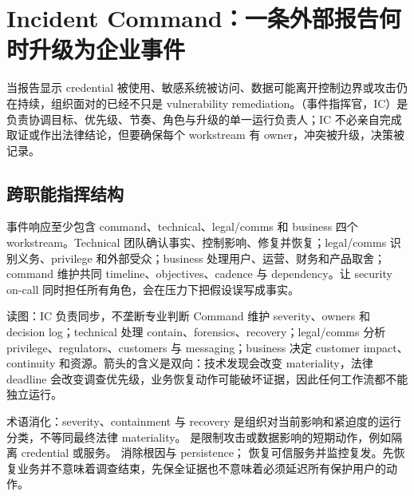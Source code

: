\section{Incident Command：一条外部报告何时升级为企业事件}

当报告显示 credential 被使用、敏感系统被访问、数据可能离开控制边界或攻击仍在持续，组织面对的已经不只是 vulnerability remediation。（事件指挥官，IC）是负责协调目标、优先级、节奏、角色与升级的单一运行负责人；IC 不必亲自完成取证或作出法律结论，但要确保每个 workstream 有 owner，冲突被升级，决策被记录。

\subsection{跨职能指挥结构}

事件响应至少包含 command、technical、legal/comms 和 business 四个 workstream。Technical 团队确认事实、控制影响、修复并恢复；legal/comms 识别义务、privilege 和外部受众；business 处理用户、运营、财务和产品取舍；command 维护共同 timeline、objectives、cadence 与 dependency。让 security on-call 同时担任所有角色，会在压力下把假设误写成事实。


\begin{knowledgebox}{读图：IC 负责同步，不垄断专业判断}
Command 维护 severity、owners 和 decision log；technical 处理 contain、forensics、recovery；legal/comms 分析 privilege、regulators、customers 与 messaging；business 决定 customer impact、continuity 和资源。箭头的含义是双向：技术发现会改变 materiality，法律 deadline 会改变调查优先级，业务恢复动作可能破坏证据，因此任何工作流都不能独立运行。
\end{knowledgebox}

\begin{knowledgebox}{术语消化：severity、containment 与 recovery}
 是组织对当前影响和紧迫度的运行分类，不等同最终法律 materiality。 是限制攻击或数据影响的短期动作，例如隔离 credential 或服务。 消除根因与 persistence； 恢复可信服务并监控复发。先恢复业务并不意味着调查结束，先保全证据也不意味着必须延迟所有保护用户的动作。
\end{knowledgebox}


